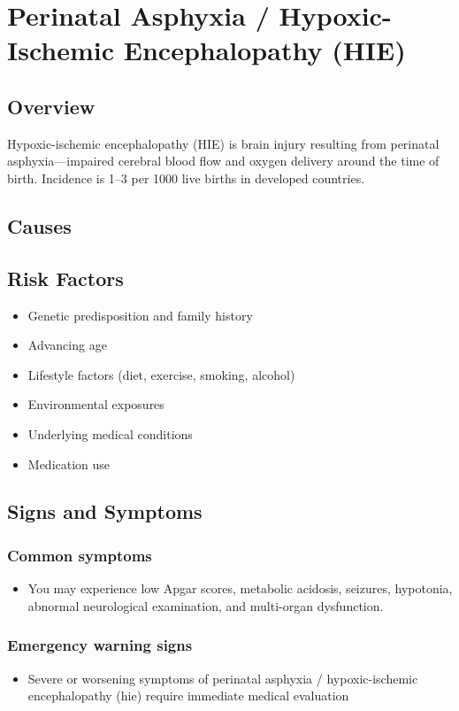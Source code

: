 \chapter{Perinatal Asphyxia / Hypoxic-Ischemic Encephalopathy (HIE)}
\label{sec:Hypoxic-Ischemic Encephalopathy}

\section{Overview}
Hypoxic-ischemic encephalopathy (HIE) is brain injury resulting from perinatal asphyxia---impaired cerebral blood flow and oxygen delivery around the time of birth. Incidence is 1--3 per 1000 live births in developed countries.
\section{Causes}
\section{Risk Factors}

\begin{itemize}[noitemsep]
  \item Genetic predisposition and family history
  \item Advancing age
  \item Lifestyle factors (diet, exercise, smoking, alcohol)
  \item Environmental exposures
  \item Underlying medical conditions
  \item Medication use
\end{itemize}
\section{Signs and Symptoms}

\subsection{Common symptoms}
\begin{itemize}[noitemsep]
  \item You may experience low Apgar scores, metabolic acidosis, seizures, hypotonia, abnormal neurological examination, and multi-organ dysfunction. 
  \end{itemize}

\subsection{Emergency warning signs}
\begin{itemize}[noitemsep]
  \item Severe or worsening symptoms of perinatal asphyxia / hypoxic-ischemic encephalopathy (hie) require immediate medical evaluation
\end{itemize}
